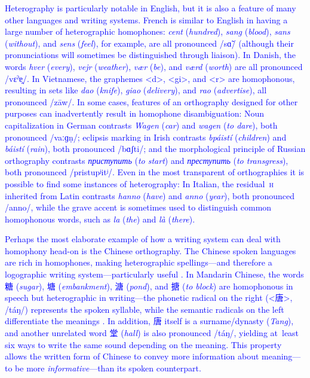 \documentclass[doc,biblatex]{apa7}
\newcommand\newmaterial[1]{\textcolor{blue}{#1}}
\begin{document}
\newmaterial{Heterography is particularly notable in English, but it is also a feature of many other languages and writing systems. French is similar to English in having a large number of heterographic homophones: \textit{cent} (\textit{hundred}), \textit{sang} (\textit{blood}), \textit{sans} (\textit{without}), and \textit{sens} (\textit{feel}), for example, are all pronounced /sɑ̃/ (although their pronunciations will sometimes be distinguished through liaison). In Danish, the words \textit{hver} (\textit{every}), \textit{vejr} (\textit{weather}), \textit{vær} (\textit{be}), and \textit{værd} (\textit{worth}) are all pronounced /vεˀɐ̯/. In Vietnamese, the graphemes <d>, <gi>, and <r> are homophonous, resulting in sets like \textit{dao} (\textit{knife}), \textit{giao} (\textit{delivery}), and \textit{rao} (\textit{advertise}), all pronounced /zāw/. In some cases, features of an orthography designed for other purposes can inadvertently result in homophone disambiguation: Noun capitalization in German contrasts \textit{Wagen} (\textit{car}) and \textit{wagen} (\textit{to dare}), both pronounced /vaːɡṇ/; eclipsis marking in Irish contrasts \textit{bpáistí} (\textit{children}) and \textit{báistí} (\textit{rain}), both pronounced /bɑʃti/; and the morphological principle of Russian orthography contrasts \textit{приступить} (\textit{to start}) and \textit{преступить} (\textit{to transgress}), both pronounced /pristupʲitʲ/. Even in the most transparent of orthographies it is possible to find some instances of heterography: In Italian, the residual~\textsc{h} inherited from Latin contrasts \textit{hanno} (\textit{have}) and \textit{anno} (\textit{year}), both pronounced /anno/, while the grave accent is sometimes used to distinguish common homophonous words, such as \textit{la} (\textit{the}) and \textit{là} (\textit{there}).}

\newmaterial{Perhaps the most elaborate example of how a writing system can deal with homophony head-on is the Chinese orthography. The Chinese spoken languages are rich in homophones, making heterographic spellings---and therefore a logographic writing system---particularly useful \parencite{Frost:2012}. In Mandarin Chinese, the words 糖 (\textit{sugar}), 塘 (\textit{embankment}), 溏 (\textit{pond}), and 搪 (\textit{to block}) are homophonous in speech but heterographic in writing---the phonetic radical on the right (<唐>, /táŋ/) represents the spoken syllable, while the semantic radicals on the left differentiate the meanings \parencite[p.~101]{Coulmas:1991}. In addition, 唐 itself is a surname/dynasty (\textit{Tang}), and another unrelated word 堂 (\textit{hall}) is also pronounced /táŋ/, yielding at~least six ways to write the same sound depending on the meaning. This property allows the written form of Chinese to convey more information about meaning---to be more \textit{informative}---than its spoken counterpart.}
\end{document}
